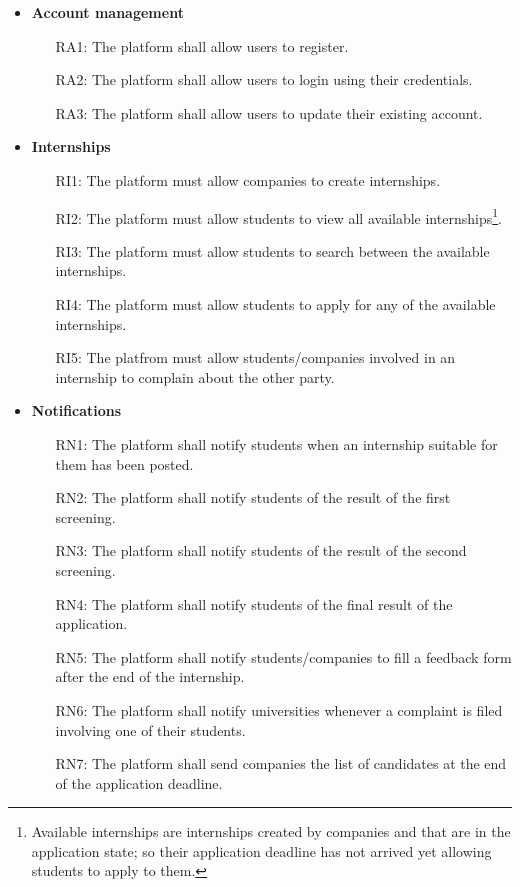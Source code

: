\documentclass[11pt,twoside]{article}
\begin{document}
\begin{itemize}
\item \textbf{Account management}
\begin{itemize}
\item[RA1:] The platform shall allow users to register.
\item[RA2:] The platform shall allow users to login using their credentials.
\item[RA3:] The platform shall allow users to update their existing account.
\end{itemize}
\item \textbf{Internships}
\begin{itemize}
\item[RI1:] The platform must allow companies to create internships.
\item[RI2:] The platform must allow students to view all available internships\footnote{Available internships are internships created by companies and that are in the application state; so their application deadline has not arrived yet allowing students to apply to them.}.
\item[RI3:] The platform must allow students to search between the available internships.
\item[RI4:] The platform must allow students to apply for any of the available internships.
\item[RI5:] The platfrom must allow students/companies involved in an internship to complain about the other party.
\end{itemize}
\item \textbf{Notifications}
\begin{itemize}
\item[RN1:] The platform shall notify students when an internship suitable for them has been posted.
\item[RN2:] The platform shall notify students of the result of the first screening.
\item[RN3:] The platform shall notify students of the result of the second screening.
\item[RN4:] The platform shall notify students of the final result of the application.
\item[RN5:] The platform shall notify students/companies to fill a feedback form after the end of the internship.
\item[RN6:] The platform shall notify universities whenever a complaint is filed involving one of their students.
\item[RN7:] The platform shall send companies the list of candidates at the end of the application deadline.

\end{itemize}
\end{itemize}
\end{document}
